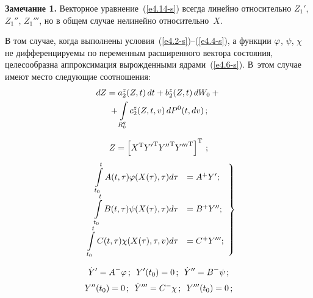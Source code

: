 \begin{multicols}{2}
\medskip

\noindent
\textbf{Замечание 1.} Векторное уравнение~(\ref{e4.14-s})
всегда линейно относительно $Z_1'$, $Z_1''$, $Z_1'''$, но в общем
случае нелинейно относительно~$X$.

\medskip

В том случае, когда выполнены условия~(\ref{e4.2-s})--(\ref{e4.4-s}),
а функции $\varphi$, $\psi$, $\chi$ не дифференцируемы по переменным расширенного
вектора состояния, целесообразна аппроксимация вырожденными ядрами~(\ref{e4.6-s}).
В~этом случае имеют место следующие соотношения:
   \begin{multline}
    dZ= a_2^z (Z,t)\, dt+ b_2^z(Z,t)\, dW_0 +{}\\
    {}+
    \int\limits_{R_0^q} c_2^z (Z,t,v)\,dP^0 (t, dv)\,;
    \label{e4.19-s}
    \end{multline}

\vspace*{-9pt}

\noindent
\begin{equation}
Z=\left[ X^{\mathrm{T}} {Y'}^{\mathrm{T}} {Y''}^{\mathrm{T}} {Y'''}^{\mathrm{T}}\right]^{\mathrm{T}}\,;
    \label{e4.20-s}
    \end{equation}
\begin{equation}
\left.
\begin{array}{rl}
\displaystyle\int\limits_{t_0}^t A(t,\tau) \varphi(X(\tau),  \tau) d\tau &= A^+ Y';\\[9pt]
\displaystyle \int\limits_{t_0}^t B(t,\tau) \psi(X(\tau),  \tau) d\tau &= B^+ Y'';\\[9pt]
\displaystyle\int\limits_{t_0}^t C(t,\tau) \chi(X(\tau),  \tau,v) d\tau &= C^+ Y''';
\end{array}
\right\}
    \label{e4.21-s}
    \end{equation}

    \vspace*{-6pt}


        \begin{gather*}
\dot Y'=A^-\varphi\,;\enskip  Y'(t_0)=0\,;\enskip
        \dot Y''=B^-\psi\,;\\[2pt]
        Y''(t_0)=0\,;\enskip
        \dot Y'''=C^-\chi\,;\enskip Y'''(t_0)=0\,;
        \end{gather*}

        \vspace*{-3pt}


\end{multicols}
